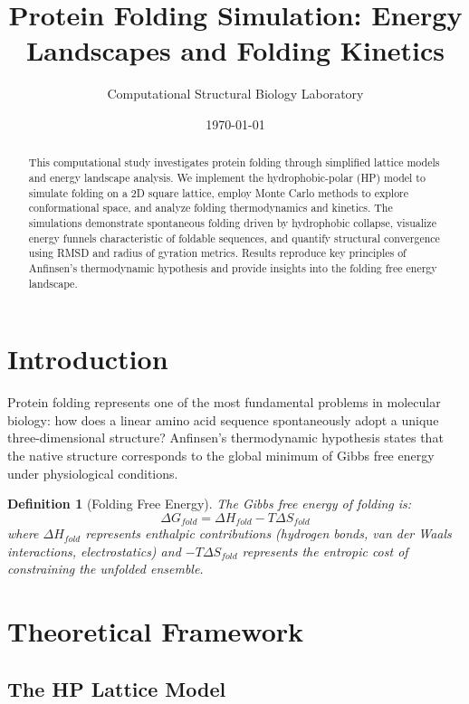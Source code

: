 \documentclass[a4paper, 11pt]{article}
\title{Protein Folding Simulation: Energy Landscapes and Folding Kinetics}
\author{Computational Structural Biology Laboratory}
\date{\today}
\newtheorem{definition}{Definition}[section]
\begin{document}
\maketitle

\begin{abstract}
This computational study investigates protein folding through simplified lattice models and
energy landscape analysis. We implement the hydrophobic-polar (HP) model to simulate folding
on a 2D square lattice, employ Monte Carlo methods to explore conformational space, and analyze
folding thermodynamics and kinetics. The simulations demonstrate spontaneous folding driven by
hydrophobic collapse, visualize energy funnels characteristic of foldable sequences, and quantify
structural convergence using RMSD and radius of gyration metrics. Results reproduce key principles
of Anfinsen's thermodynamic hypothesis and provide insights into the folding free energy landscape.
\end{abstract}

\section{Introduction}

Protein folding represents one of the most fundamental problems in molecular biology: how does
a linear amino acid sequence spontaneously adopt a unique three-dimensional structure? Anfinsen's
thermodynamic hypothesis states that the native structure corresponds to the global minimum of
Gibbs free energy under physiological conditions.

\begin{definition}[Folding Free Energy]
The Gibbs free energy of folding is:
\begin{equation}
\Delta G_{fold} = \Delta H_{fold} - T\Delta S_{fold}
\end{equation}
where $\Delta H_{fold}$ represents enthalpic contributions (hydrogen bonds, van der Waals
interactions, electrostatics) and $-T\Delta S_{fold}$ represents the entropic cost of
constraining the unfolded ensemble.
\end{definition}

\section{Theoretical Framework}

\subsection{The HP Lattice Model}
\end{document}
